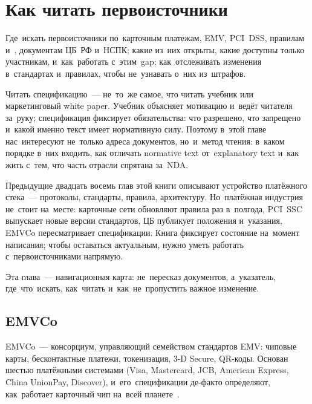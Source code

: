 \chapter{Как читать первоисточники}
\label{ch:primary-sources}

\begin{kaobox}[title=Что вы узнаете из этой главы]
  Где~искать первоисточники по~карточным платежам, EMV,
  PCI~DSS, правилам  и~,
  документам ЦБ~РФ и~НСПК; какие из~них открыты, какие
  доступны только участникам, и~как~работать с~этим~gap;
  как~отслеживать изменения в~стандартах и~правилах,
  чтобы не~узнавать о~них из~штрафов.
\end{kaobox}

Читать спецификацию~--- не~то~же самое, что читать учебник или
маркетинговый white paper. Учебник объясняет мотивацию и~ведёт
читателя за~руку; спецификация фиксирует обязательства: что разрешено,
что запрещено и~какой именно текст имеет нормативную силу. Поэтому
в~этой главе нас~интересуют не~только адреса документов, но~и~метод
чтения: в~каком порядке в~них входить, как отличать normative text
от~explanatory text и~как жить с~тем, что часть отрасли спрятана
за~NDA.

Предыдущие двадцать восемь глав этой книги описывают
устройство платёжного стека~--- протоколы, стандарты, правила,
архитектуру. Но~платёжная индустрия не~стоит на~месте:
карточные сети обновляют правила раз в~полгода, PCI~SSC
выпускает новые версии стандартов, ЦБ публикует положения
и~указания, EMVCo пересматривает спецификации. Книга фиксирует
состояние на~момент написания; чтобы оставаться актуальным,
нужно уметь работать с~первоисточниками напрямую.

Эта глава~--- навигационная карта: не~пересказ документов,
а~указатель, где~что~искать, как~читать и~как~не~пропустить
важное изменение.


\section{EMVCo}
\label{sec:ps-emvco}

EMVCo~--- консорциум, управляющий семейством стандартов EMV:
чиповые карты, бесконтактные платежи, токенизация, 3-D Secure,
QR-коды. Основан шестью платёжными системами (Visa, Mastercard,
JCB, American Express, China UnionPay, Discover), и~его~спецификации
де-факто определяют, как~работает карточный чип на~всей
планете~.

